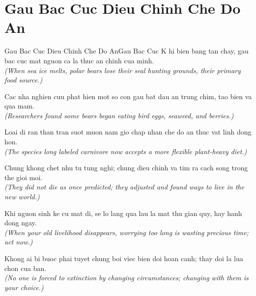 \section{Gau Bac Cuc Dieu Chinh Che Do An}
\begin{truyen}{Gau Bac Cuc Dieu Chinh Che Do An}{Gau Bac Cuc}
K hi bien bang tan chay, gau bac cuc mat nguon ca la thuc an chinh cua minh.\\
\textit{(When sea ice melts, polar bears lose their seal hunting grounds, their primary food source.)}

Cac nha nghien cuu phat hien mot so con gau bat dau an trung chim, tao bien va qua mam.\\
\textit{(Researchers found some bears began eating bird eggs, seaweed, and berries.)}

Loai di ran than tran suot muon nam gio chap nhan che do an thuc vat linh dong hon.\\
\textit{(The species long labeled carnivore now accepts a more flexible plant-heavy diet.)}

Chung khong chet nhu tu tung nghi; chung dieu chinh va tim ra cach song trong the gioi moi.\\
\textit{(They did not die as once predicted; they adjusted and found ways to live in the new world.)}

Khi nguon sinh ke cu mat di, se lo lang qua lau la mat thu gian quy, hay hanh dong ngay.\\
\textit{(When your old livelihood disappears, worrying too long is wasting precious time; act now.)}

\end{truyen}
\begin{baihoc}
  Khong ai bi buoc phai tuyet chung boi viec bien doi hoan canh; thay doi la lua chon cua ban.\\
  \textit{(No one is forced to extinction by changing circumstances; changing with them is your choice.)}
\end{baihoc}

